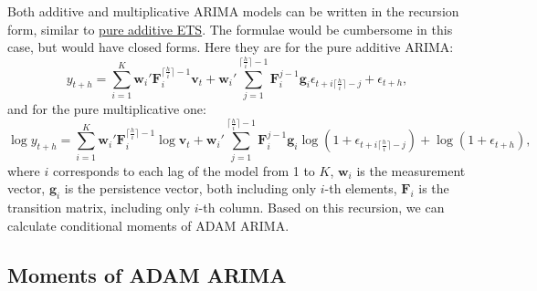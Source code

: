 \documentclass[
]{book}
\theoremstyle{definition}
\theoremstyle{definition}
\theoremstyle{definition}
\theoremstyle{definition}
\theoremstyle{remark}
\begin{document}
Both additive and multiplicative ARIMA models can be written in the recursion form, similar to \protect\hyperlink{adamETSPureAdditiveRecursive}{pure additive ETS}. The formulae would be cumbersome in this case, but would have closed forms. Here they are for the pure additive ARIMA:
\begin{equation}
    y_{t+h} = \sum_{i=1}^K \mathbf{w}_{i}' \mathbf{F}_{i}^{\lceil\frac{h}{i}\rceil-1} \mathbf{v}_{t} + \mathbf{w}_{i}' \sum_{j=1}^{\lceil\frac{h}{i}\rceil-1} \mathbf{F}_{i}^{j-1} \mathbf{g}_{i} \epsilon_{t+i\lceil\frac{h}{i}\rceil-j} + \epsilon_{t+h} ,
  \label{eq:ADAMARIMAStateSpacePureAdditiveRecursion}
\end{equation}
and for the pure multiplicative one:
\begin{equation}
    \log y_{t+h} = \sum_{i=1}^K \mathbf{w}_{i}' \mathbf{F}_{i}^{\lceil\frac{h}{i}\rceil-1} \log \mathbf{v}_{t} + \mathbf{w}_{i}' \sum_{j=1}^{\lceil\frac{h}{i}\rceil-1} \mathbf{F}_{i}^{j-1} \mathbf{g}_{i} \log (1+\epsilon_{t+i\lceil\frac{h}{i}\rceil-j}) + \log(1+ \epsilon_{t+h}) ,
  \label{eq:ADAMARIMAStateSpacePureMultiplicativeRecursion}
\end{equation}
where \(i\) corresponds to each lag of the model from 1 to \(K\), \(\mathbf{w}_{i}\) is the measurement vector, \(\mathbf{g}_{i}\) is the persistence vector, both including only \(i\)-th elements, \(\mathbf{F}_{i}\) is the transition matrix, including only \(i\)-th column. Based on this recursion, we can calculate conditional moments of ADAM ARIMA.

\hypertarget{ADAMARIMARecursiveMoments}{%
\subsection{Moments of ADAM ARIMA}\label{ADAMARIMARecursiveMoments}}
\end{document}
